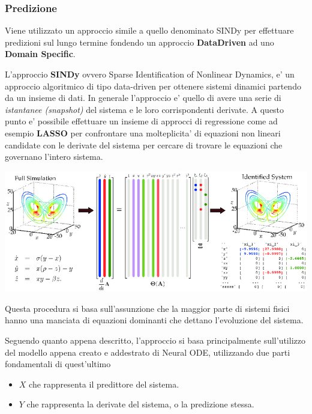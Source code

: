\subsubsection*{Predizione}
Viene utilizzato un approccio simile a quello denominato SINDy \cite{wiki:Sparse_identification_of_non-linear_dynamics}
per effettuare predizioni sul lungo termine fondendo un approccio \textbf{DataDriven} ad uno
\textbf{Domain Specific}.  

L'approccio \textbf{SINDy} ovvero Sparse Identification of Nonlinear Dynamics, e' un approccio algoritmico 
di tipo data-driven per ottenere sistemi dinamici partendo da un insieme di dati. In generale l'approccio e' 
quello di avere una serie di \emph{istantanee (snapshot)} del sistema e le loro corrispondenti derivate. A questo 
punto e' possibile effettuare un insieme di approcci di regressione come ad esempio \textbf{LASSO} \cite{wiki:Lasso_(statistics)}
per confrontare una molteplicita' di equazioni non lineari candidate con le derivate del sistema
per cercare di trovare le equazioni che governano l'intero sistema.

\begin{minipage}{\linewidth}
	\centering
	\includegraphics[width=\textwidth]{img/Schematic-of-the-sparse-identification-of-nonlinear-dynamics-SINDy-algorithm-25-as.png}
	\label{fig:sindy}
\end{minipage}

Questa procedura si basa sull'assunzione che la maggior parte di sistemi fisici hanno una manciata
di equazioni dominanti che dettano l'evoluzione del sistema.

Seguendo quanto appena descritto, l'approccio si basa principalmente sull'utilizzo del modello 
appena creato e addestrato di Neural ODE, utilizzando due parti fondamentali di quest'ultimo

\begin{itemize}
	\item \textbf{$X$} che rappresenta il predittore del sistema.
	\item \textbf{$Y$} che rappresenta la derivate del sistema, o la predizione stessa.
\end{itemize}

